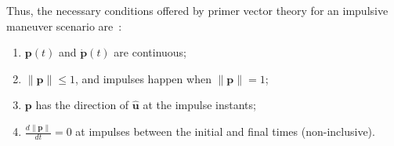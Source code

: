Thus, the necessary conditions offered by primer vector theory for an impulsive maneuver scenario are~\cite{Conway_2010}:
\begin{enumerate}
    \item \(\mathbf{p}(t)\) and \(\dot{\mathbf{p}}(t)\) are continuous;
    \item \(\lVert \mathbf{p} \rVert \leq 1\), and impulses happen when \(\lVert \mathbf{p} \rVert = 1\);
    \item \(\mathbf{p}\) has the direction of \(\hat{\mathbf{u}}\) at the impulse instants;
    \item \(\frac{d \lVert \mathbf{p} \rVert}{dt} = 0\) at impulses between the initial and final times (non-inclusive).
\end{enumerate}